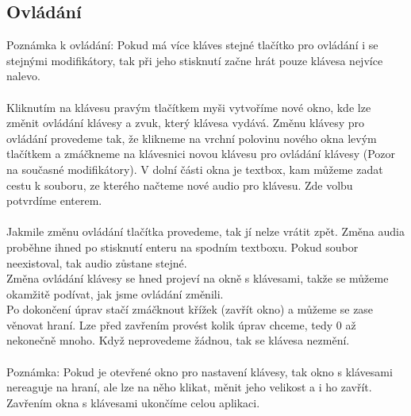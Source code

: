 \documentclass[12pt]{article}
\begin{document}
	\newpage
	\subsection{Ovládání}
	Poznámka k ovládání: Pokud má více kláves stejné tlačítko pro ovládání i se stejnými modifikátory, tak při jeho stisknutí začne hrát pouze klávesa nejvíce nalevo.
	\\
	\\
	Kliknutím na klávesu pravým tlačítkem myši vytvoříme nové okno, kde lze změnit ovládání klávesy a zvuk, který klávesa vydává. Změnu klávesy pro ovládání provedeme tak, že klikneme na vrchní polovinu nového okna levým tlačítkem a zmáčkneme na klávesnici novou klávesu pro ovládání klávesy (Pozor na současné modifikátory). V dolní části okna je textbox, kam můžeme zadat cestu k souboru, ze kterého načteme nové audio pro klávesu. Zde volbu potvrdíme enterem.
	\\
	\\
	Jakmile změnu ovládání tlačítka provedeme, tak jí nelze vrátit zpět. Změna audia proběhne ihned po stisknutí enteru na spodním textboxu. Pokud soubor neexistoval, tak audio zůstane stejné. 
	\\
	Změna ovládání klávesy se hned projeví na okně s klávesami, takže se můžeme okamžitě podívat, jak jsme ovládání změnili.
	\\
	Po dokončení úprav stačí zmáčknout křížek (zavřít okno) a můžeme se zase věnovat hraní. Lze před zavřením provést kolik úprav chceme, tedy 0 až nekonečně mnoho. Když neprovedeme žádnou, tak se klávesa nezmění.
	\\
	\\
	Poznámka: Pokud je otevřené okno pro nastavení klávesy, tak okno s klávesami nereaguje na hraní, ale lze na něho klikat, měnit jeho velikost a i ho zavřít. Zavřením okna s klávesami ukončíme celou aplikaci.
	
	\newpage
\end{document}
